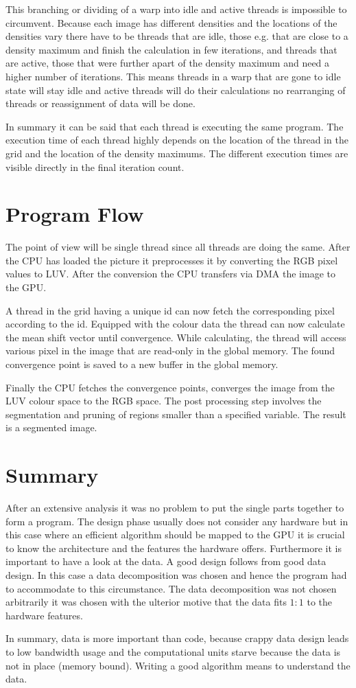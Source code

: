 This branching or dividing of a warp into idle and active threads is impossible
to circumvent. Because each image has different densities and the locations
of the densities vary there have to be threads that are idle, those e.g. that
are close to a density maximum and finish the calculation in few iterations,
and threads that are active, those that were further apart of the density maximum
and need a higher number of iterations. This means threads in a warp that
are gone to idle state will stay idle and active threads will do their 
calculations no rearranging of threads or reassignment of data will be done. 

In summary it can be said that each thread is executing the same program. The 
execution time of each thread highly depends on the location of the thread in
the grid and the location of the density maximums. The different execution times
are visible directly in the final iteration count. 

\section{Program Flow} %
\label{sec:program_flow}

The point of view will be single thread since all threads are doing the same. 
After the \gls{CPU} has loaded the picture it preprocesses it by converting
the \gls{RGB} pixel values to \gls{LUV}. After the conversion the \gls{CPU}
transfers via \gls{DMA} the image to the \gls{GPU}.

A thread in the grid having a unique id can now fetch the corresponding pixel
according to the id. Equipped with the colour data the thread can now calculate
the mean shift vector until convergence. While calculating, the thread will 
access various pixel in the image that are read-only in the global memory. The 
found convergence point is saved to a new buffer in the global memory.

Finally the \gls{CPU} fetches the convergence points, converges the image from 
the \gls{LUV} colour space to the \gls{RGB} space. The post processing step
involves the segmentation and pruning of regions smaller than a specified 
variable. The result is a segmented image. 


\section{Summary} %
\label{sec:design_summary}
After an extensive analysis it was no problem to put the single parts together
to form a program. The design phase usually does not consider any hardware but
in this case where an efficient algorithm should be mapped to the \gls{GPU} it
is crucial to know the architecture and the features the hardware offers. 
Furthermore it is important to have a look at the data. A good design follows
from good data design. In this case a data decomposition was chosen and hence the 
program had to accommodate to this circumstance. The data decomposition was not 
chosen arbitrarily it was chosen with the ulterior motive that the data fits
$1:1$ to the hardware features. 

In summary, data is more important than code, because crappy data design leads
to low bandwidth usage and the computational units starve because the data
is not in place (memory bound). Writing a good algorithm means to understand the 
data. 




